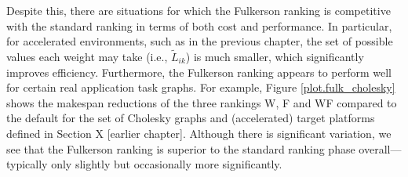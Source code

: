 \documentclass[12pt]{article}
\begin{document}
Despite this, there are situations for which the Fulkerson ranking is competitive with the standard ranking in terms of both cost and performance. In particular, for accelerated environments, such as in the previous chapter, the set of possible values each weight may take (i.e., $\tilde{L}_{ik}$) is much smaller, which significantly improves efficiency. Furthermore, the Fulkerson ranking appears to perform well for certain real application task graphs. For example, Figure \ref{plot.fulk_cholesky} shows the makespan reductions of the three rankings W, F and WF compared to the default for the set of Cholesky graphs and (accelerated) target platforms defined in Section X [earlier chapter]. Although there is significant variation, we see that the Fulkerson ranking is superior to the standard ranking phase overall---typically only slightly but occasionally more significantly.   
\end{document}
